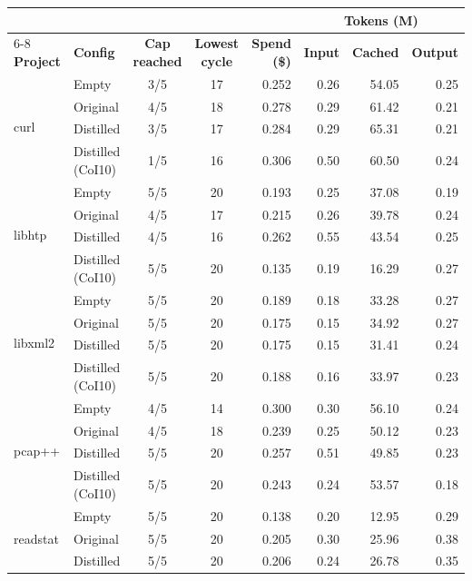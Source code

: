 \begin{table}[!b]
  \centering
  \scriptsize
  \setlength{\tabcolsep}{3pt}
  \renewcommand{\arraystretch}{0.9}
  \begin{tabular}{llccrrrr}
    \toprule
       &  &  &  &  & \multicolumn{3}{c}{\textbf{Tokens (M)}} \\
      \cmidrule(lr){6-8}
      \textbf{Project} & \textbf{Config} & \textbf{Cap reached} & \textbf{Lowest cycle} & \textbf{Spend (\$)} & \textbf{Input} & \textbf{Cached} & \textbf{Output} \\
    \midrule
      \multirow{4}{*}{curl} & Empty & 3/5 & 17 & 0.252 & 0.26 & 54.05 & 0.25 \\
       & Original & 4/5 & 18 & 0.278 & 0.29 & 61.42 & 0.21 \\
       & Distilled & 3/5 & 17 & 0.284 & 0.29 & 65.31 & 0.21 \\
       & Distilled (CoI10) & 1/5 & 16 & 0.306 & 0.50 & 60.50 & 0.24 \\
      \multirow{4}{*}{libhtp} & Empty & 5/5 & 20 & 0.193 & 0.25 & 37.08 & 0.19 \\
       & Original & 4/5 & 17 & 0.215 & 0.26 & 39.78 & 0.24 \\
       & Distilled & 4/5 & 16 & 0.262 & 0.55 & 43.54 & 0.25 \\
       & Distilled (CoI10) & 5/5 & 20 & 0.135 & 0.19 & 16.29 & 0.27 \\
      \multirow{4}{*}{libxml2} & Empty & 5/5 & 20 & 0.189 & 0.18 & 33.28 & 0.27 \\
       & Original & 5/5 & 20 & 0.175 & 0.15 & 34.92 & 0.27 \\
       & Distilled & 5/5 & 20 & 0.175 & 0.15 & 31.41 & 0.24 \\
       & Distilled (CoI10) & 5/5 & 20 & 0.188 & 0.16 & 33.97 & 0.23 \\
      \multirow{4}{*}{pcap++} & Empty & 4/5 & 14 & 0.300 & 0.30 & 56.10 & 0.24 \\
       & Original & 4/5 & 18 & 0.239 & 0.25 & 50.12 & 0.23 \\
       & Distilled & 5/5 & 20 & 0.257 & 0.51 & 49.85 & 0.23 \\
       & Distilled (CoI10) & 5/5 & 20 & 0.243 & 0.24 & 53.57 & 0.18 \\
      \multirow{4}{*}{readstat} & Empty & 5/5 & 20 & 0.138 & 0.20 & 12.95 & 0.29 \\
       & Original & 5/5 & 20 & 0.205 & 0.30 & 25.96 & 0.38 \\
       & Distilled & 5/5 & 20 & 0.206 & 0.24 & 26.78 & 0.35 \\

\end{tabular}
\end{table}
